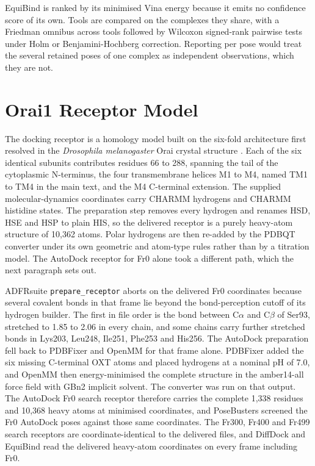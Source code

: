EquiBind is ranked by its minimised Vina energy because it emits no confidence score of its own. Tools are compared on the complexes they share, with a Friedman omnibus across tools followed by Wilcoxon signed-rank pairwise tests under Holm or Benjamini-Hochberg correction. Reporting per pose would treat the several retained poses of one complex as independent observations, which they are not.

\hypertarget{orai1-receptor-model}{%
\chapter{Orai1 Receptor Model}\label{orai1-receptor-model}}

The docking receptor is a homology model built on the six-fold architecture first resolved in the \emph{Drosophila melanogaster} Orai crystal structure \cite{ref037}. Each of the six identical subunits contributes residues 66 to 288, spanning the tail of the cytoplasmic N-terminus, the four transmembrane helices M1 to M4, named TM1 to TM4 in the main text, and the M4 C-terminal extension. The supplied molecular-dynamics coordinates carry CHARMM hydrogens and CHARMM histidine states. The preparation step removes every hydrogen and renames HSD, HSE and HSP to plain HIS, so the delivered receptor is a purely heavy-atom structure of 10,362 atoms. Polar hydrogens are then re-added by the PDBQT converter under its own geometric and atom-type rules rather than by a titration model. The AutoDock receptor for Fr0 alone took a different path, which the next paragraph sets out.

ADFRsuite \texttt{prepare\_receptor} aborts on the delivered Fr0 coordinates because several covalent bonds in that frame lie beyond the bond-perception cutoff of its hydrogen builder. The first in file order is the bond between C\ensuremath{\alpha} and C\ensuremath{\beta} of Ser93, stretched to 1.85 to 2.06\angstrom{} in every chain, and some chains carry further stretched bonds in Lys203, Leu248, Ile251, Phe253 and His256. The AutoDock preparation fell back to PDBFixer and OpenMM for that frame alone. PDBFixer added the six missing C-terminal OXT atoms and placed hydrogens at a nominal pH of 7.0, and OpenMM then energy-minimised the complete structure in the amber14-all force field with GBn2 implicit solvent. The converter was run on that output. The AutoDock Fr0 search receptor therefore carries the complete 1,338 residues and 10,368 heavy atoms at minimised coordinates, and PoseBusters screened the Fr0 AutoDock poses against those same coordinates. The Fr300, Fr400 and Fr499 search receptors are coordinate-identical to the delivered files, and DiffDock and EquiBind read the delivered heavy-atom coordinates on every frame including Fr0.

